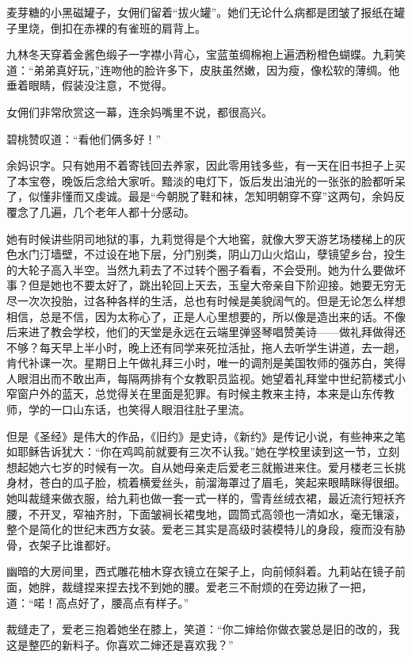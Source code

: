 \par 麦芽糖的小黑磁罐子，女佣们留着“拔火罐”。她们无论什么病都是团皱了报纸在罐子里烧，倒扣在赤裸的有雀班的肩背上。
\par 九林冬天穿着金酱色缎子一字襟小背心，宝蓝茧绸棉袍上遍洒粉橙色蝴蝶。九莉笑道：“弟弟真好玩，”连吻他的脸许多下，皮肤虽然嫩，因为瘦，像松软的薄绸。他垂着眼睛，假装没注意，不觉得。
\par 女佣们非常欣赏这一幕，连余妈嘴里不说，都很高兴。
\par 碧桃赞叹道：“看他们俩多好！”
\par 余妈识字。只有她用不着寄钱回去养家，因此零用钱多些，有一天在旧书担子上买了本宝卷，晚饭后念给大家听。黯淡的电灯下，饭后发出油光的一张张的脸都听呆了，似懂非懂而又虔诚。最是“今朝脱了鞋和袜，怎知明朝穿不穿”这两句，余妈反覆念了几遍，几个老年人都十分感动。
\par 她有时候讲些阴司地狱的事，九莉觉得是个大地窖，就像大罗天游艺场楼梯上的灰色水门汀墙壁，不过设在地下层，分门别类，阴山刀山火焰山，孽镜望乡台，投生的大轮子高入半空。当然九莉去了不过转个圈子看看，不会受刑。她为什么要做坏事？但是她也不要太好了，跳出轮回上天去，玉皇大帝亲自下阶迎接。她要无穷无尽一次次投胎，过各种各样的生活，总也有时候是美貌阔气的。但是无论怎么样想相信，总是不信，因为太称心了，正是人心里想要的，所以像是造出来的话。不像后来进了教会学校，他们的天堂是永远在云端里弹竖琴唱赞美诗——做礼拜做得还不够？每天早上半小时，晚上还有同学来死拉活扯，拖人去听学生讲道，去一趟，肯代补课一次。星期日上午做礼拜三小时，唯一的调剂是美国牧师的强苏白，笑得人眼泪出而不敢出声，每隔两排有个女教职员监视。她望着礼拜堂中世纪箭楼式小窄窗户外的蓝天，总觉得关在里面是犯罪。有时候主教来主持，本来是山东传教师，学的一口山东话，也笑得人眼泪往肚子里流。
\par 但是《圣经》是伟大的作品，《旧约》是史诗，《新约》是传记小说，有些神来之笔如耶稣告诉犹大：“你在鸡鸣前就要有三次不认我。”她在学校里读到这一节，立刻想起她六七岁的时候有一次。自从她母亲走后爱老三就搬进来住。爱月楼老三长挑身材，苍白的瓜子脸，梳着横爱丝头，前溜海罩过了眉毛，笑起来眼睛眯得很细。她叫裁缝来做衣服，给九莉也做一套一式一样的，雪青丝绒衣裙，最近流行短袄齐腰，不开叉，窄袖齐肘，下面皱裥长裙曳地，圆筒式高领也一清如水，毫无镶滚，整个是简化的世纪末西方女装。爱老三其实是高级时装模特儿的身段，瘦而没有胁骨，衣架子比谁都好。
\par 幽暗的大房间里，西式雕花柚木穿衣镜立在架子上，向前倾斜着。九莉站在镜子前面，她胖，裁缝捏来捏去找不到她的腰。爱老三不耐烦的在旁边揪了一把，道：“喏！高点好了，腰高点有样子。”
\par 裁缝走了，爱老三抱着她坐在膝上，笑道：“你二婶给你做衣裳总是旧的改的，我这是整匹的新料子。你喜欢二婶还是喜欢我？”
